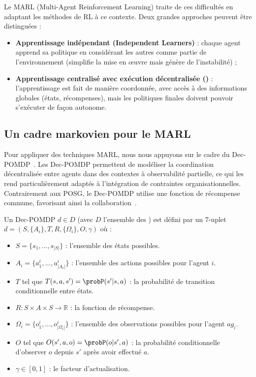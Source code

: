 Le \ac{MARL} (Multi-Agent Reinforcement Learning) traite de ces difficultés en adaptant les méthodes de \ac{RL} à ce contexte. Deux grandes approches peuvent être distinguées :
\begin{itemize}
    \item \textbf{Apprentissage indépendant (Independent Learners)} : chaque agent apprend sa politique en considérant les autres comme partie de l'environnement (simplifie la mise en œuvre mais génère de l'instabilité) ;
    \item \textbf{Apprentissage centralisé avec exécution décentralisée ()} : l'apprentissage est fait de manière coordonnée, avec accès à des informations globales (états, récompenses), mais les politiques finales doivent pouvoir s'exécuter de façon autonome.
\end{itemize}

\subsection{Un cadre markovien pour le MARL}

Pour appliquer des techniques \ac{MARL}, nous nous appuyons sur le cadre du \ac{Dec-POMDP}~\cite{Oliehoek2016}. Les \ac{Dec-POMDP} permettent de modéliser la coordination décentralisée entre agents dans des contextes à observabilité partielle, ce qui les rend particulièrement adaptés à l'intégration de contraintes organisationnelles. Contrairement aux \ac{POSG}, le \ac{Dec-POMDP} utilise une fonction de récompense commune, favorisant ainsi la collaboration~\cite{Beynier2013}.

Un \ac{Dec-POMDP} $d \in D$ (avec $D$ l'ensemble des ) est défini par un 7-uplet $d = (S,\{A_i\},T,R,\{\Omega_i\},O,\gamma)$ où :
\begin{itemize}
    \item $S = \{s_1, ..., s_{|S|}\}$ : l'ensemble des états possibles.
    \item $A_i = \{a_1^i, ..., a_{|A_i|}^i\}$ : l'ensemble des actions possibles pour l'agent $i$.
    \item $T$ tel que $T(s,a,s') = \probP(s'|s,a)$ : la probabilité de transition conditionnelle entre états.
    \item $R: S \times A \times S \rightarrow \mathbb{R}$ : la fonction de récompense.
    \item $\Omega_i = \{o_1^i, ..., o_{|\Omega_i|}^i\}$ : l'ensemble des observations possibles pour l'agent $ag_i$.
    \item $O$ tel que $O(s',a,o) = \probP(o|s',a)$ : la probabilité conditionnelle d'observer $o$ depuis $s'$ après avoir effectué $a$.
    \item $\gamma \in [0,1]$ : le facteur d'actualisation.
\end{itemize}

